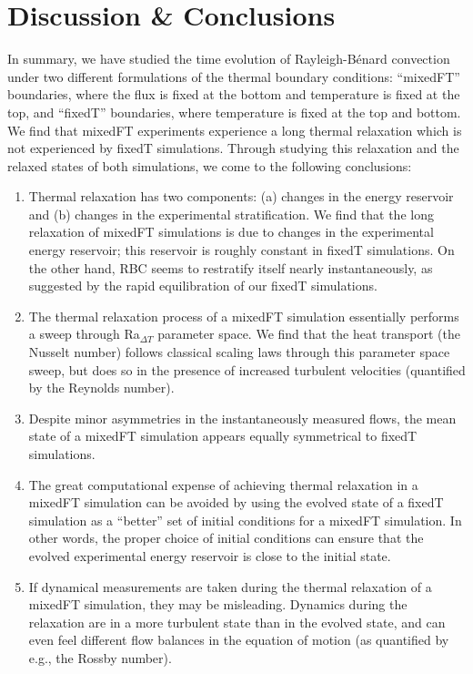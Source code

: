 \documentclass[aps, pre, onecolumn, nofootinbib, notitlepage, groupedaddress, amsfonts, amssymb, amsmath, longbibliography]{revtex4-1}
\newcommand{\RB}{Rayleigh-B\'{e}nard }
\begin{document}

\section{Discussion \& Conclusions}
\label{sec:discussion}
In summary, we have studied the time evolution of \RB convection under two different formulations of the thermal boundary conditions: ``mixedFT'' boundaries, where the flux is fixed at the bottom and temperature is fixed at the top, and ``fixedT'' boundaries, where temperature is fixed at the top and bottom.
We find that mixedFT experiments experience a long thermal relaxation which is not experienced by fixedT simulations.
Through studying this relaxation and the relaxed states of both simulations, we come to the following conclusions:
\begin{enumerate}
\item Thermal relaxation has two components: (a) changes in the energy reservoir and (b) changes in the experimental stratification.
We find that the long relaxation of mixedFT simulations is due to changes in the experimental energy reservoir; this reservoir is roughly constant in fixedT simulations.
On the other hand, RBC seems to restratify itself nearly instantaneously, as suggested by the rapid equilibration of our fixedT simulations.
\item The thermal relaxation process of a mixedFT simulation essentially performs a sweep through Ra$_{\Delta T}$ parameter space.
We find that the heat transport (the Nusselt number) follows classical scaling laws through this parameter space sweep, but does so in the presence of increased turbulent velocities (quantified by the Reynolds number).
\item Despite minor asymmetries in the instantaneously measured flows, the mean state of a mixedFT simulation appears equally symmetrical to fixedT simulations.
\item The great computational expense of achieving thermal relaxation in a mixedFT simulation can be avoided by using the evolved state of a fixedT simulation as a ``better'' set of initial conditions for a mixedFT simulation.
In other words, the proper choice of initial conditions can ensure that the evolved experimental energy reservoir is close to the initial state.
\item If dynamical measurements are taken during the thermal relaxation of a mixedFT simulation, they may be misleading.
Dynamics during the relaxation are in a more turbulent state than in the evolved state, and can even feel different flow balances in the equation of motion (as quantified by e.g., the Rossby number).
\end{enumerate}
\end{document}
